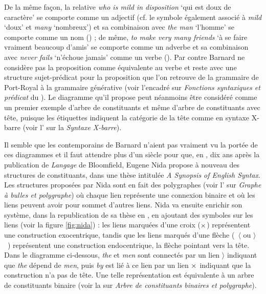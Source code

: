 {    De la même façon, la relative \textit{who is mild in disposition} ‘qui est doux de caractère’ se comporte comme un adjectif (cf. le symbole       également associé à \textit{mild} ‘doux’ et \textit{many} ‘nombreux’) et sa combinaison avec \textit{the man} ‘l’homme’ se comporte comme un nom () ; de même, \textit{to make very many friends} ‘à se faire vraiment beaucoup d’amis’ se comporte comme un adverbe et sa combinaison avec \textit{never fails} ‘n’échoue jamais’ comme un verbe (). Par contre Barnard ne considère pas la proposition comme équivalente au verbe et reste avec une structure sujet-prédicat pour la proposition que l’on retrouve de la grammaire de Port-Royal à la grammaire générative (voir l’encadré sur \textit{Fonctions syntaxiques et prédicat} du ). Le diagramme qu’il propose peut néanmoins être considéré comme un premier exemple d’arbre de constituants et même d’arbre de constituants avec tête, puisque les étiquettes indiquent la catégorie de la tête comme en syntaxe X-barre (voir l’ sur la \textit{Syntaxe X-barre}).




    Il semble que les contemporains de Barnard n’aient pas vraiment vu la portée de ces diagrammes et il faut attendre plus d’un siècle pour que, en \citeyear{nida1943morphology}, dix ans après la publication de \textit{Langage} de Bloomfield, Eugene Nida propose à nouveau des structures de constituants, dans une thèse intitulée \textit{A Synopsis of English Syntax}. Les structures proposées par Nida sont en fait des polygraphes (voir l’ sur \textit{Graphe à bulles et polygraphe}) où chaque lien représente une connexion binaire et où les liens peuvent avoir pour sommet d’autres liens. Nida va ensuite enrichir son système, dans la republication de sa thèse en \citeyear{nida1966synopsys}, en ajoutant des symboles sur les liens (voir la figure \ref{fig:nida}) : les liens marquées d’une croix ($\large\times$)
    représentent une construction exocentrique, tandis que les liens marqués d’une flèche (~$\langle$ ou $\rangle$~) représentent une construction endocentrique, la flèche pointant vers la tête. Dans le diagramme ci-dessous, \textit{the} et \textit{men} sont connectés par un lien $\rangle$ indiquant que \textit{the} dépend de \textit{men}, puis \textit{by} est lié à ce lien par un lien $\large\times$ indiquant que la construction n’a pas de tête. Une telle représentation est équivalente à un arbre de constituants binaire (voir la  sur \textit{Arbre de constituants binaires et polygraphe}).

}
